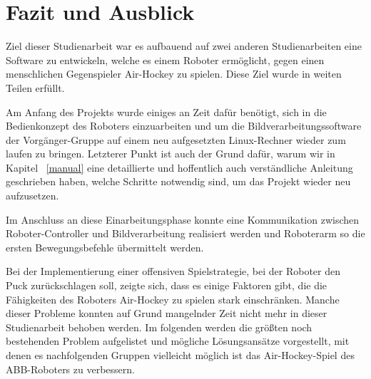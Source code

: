 
\chapter{Fazit und Ausblick}

Ziel dieser Studienarbeit war es aufbauend auf zwei anderen Studienarbeiten eine Software zu entwickeln, welche es einem Roboter ermöglicht, gegen einen menschlichen Gegenspieler Air-Hockey zu spielen. Diese Ziel wurde in weiten Teilen erfüllt. 

Am Anfang des Projekts wurde einiges an Zeit dafür benötigt, sich in die Bedienkonzept des Roboters einzuarbeiten und um die Bildverarbeitungssoftware der Vorgänger-Gruppe auf einem neu aufgesetzten Linux-Rechner wieder zum laufen zu bringen. Letzterer Punkt ist auch der Grund dafür, warum wir in Kapitel ~\ref{manual} eine detaillierte und hoffentlich auch verständliche Anleitung geschrieben haben, welche Schritte notwendig sind, um das Projekt wieder neu aufzusetzen. 

Im Anschluss an diese Einarbeitungsphase konnte eine Kommunikation zwischen Roboter-Controller und Bildverarbeitung realisiert werden und Roboterarm so die ersten Bewegungsbefehle übermittelt werden. 

Bei der Implementierung einer offensiven Spielstrategie, bei der Roboter den Puck zurückschlagen soll, zeigte sich, dass es einige Faktoren gibt, die die Fähigkeiten des Roboters Air-Hockey zu spielen stark einschränken. Manche dieser Probleme konnten auf Grund mangelnder Zeit nicht mehr in dieser Studienarbeit behoben werden. Im folgenden werden die größten noch bestehenden Problem aufgelistet und mögliche Lösungsansätze vorgestellt, mit denen es nachfolgenden Gruppen vielleicht möglich ist das Air-Hockey-Spiel des ABB-Roboters zu verbessern.

